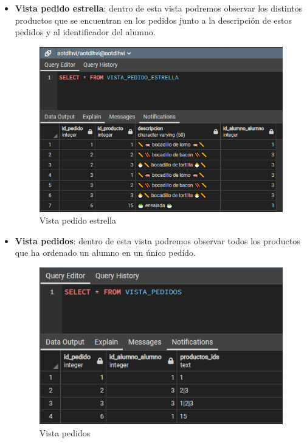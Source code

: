 \documentclass[12pt]{report}
\begin{document}
\begin{itemize}
    \item \textbf{Vista pedido estrella}: dentro de esta vista podremos observar los distintos productos que se encuentran en los pedidos junto a la descripción de estos pedidos y al identificador del alumno.
    \begin{figure}[H]
        \centering
        \includegraphics[scale = 0.75]{imagenes//base_de_datos/Vista_pedido_estrella.png}
        \caption{Vista pedido estrella}
        \label{fig:Figura}
    \end{figure}
    \newpage
    \item \textbf{Vista pedidos}: dentro de esta vista podremos observar todos los productos que ha ordenado un alumno en un único pedido.
    \begin{figure}[H]
        \centering
        \includegraphics[scale = 0.65]{imagenes//base_de_datos/Vista_pedidos.png}
        \caption{Vista pedidos}
        \label{fig:Figura}
    \end{figure}
    

\end{itemize}
\end{document}
